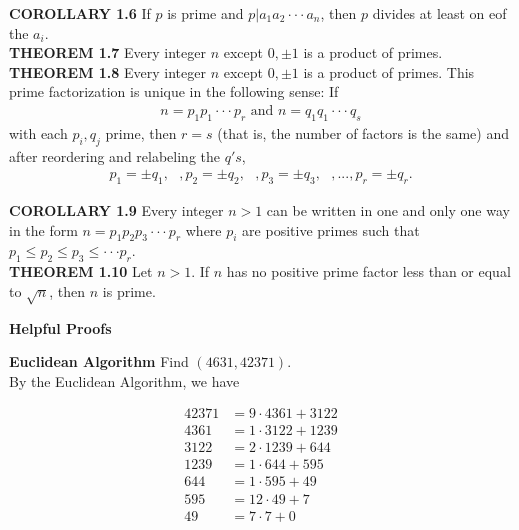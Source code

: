 \documentclass[12pt]{article}
\begin{document}
\noindent
\textbf{COROLLARY 1.6} If $p$ is prime and $p|a_1a_2 \cdot \cdot \cdot a_n$, then $p$ divides at least on eof the $a_i$. \\

\noindent
\textbf{THEOREM 1.7} Every integer $n$ except $0, \pm 1$ is a product of primes. \\

\noindent
\textbf{THEOREM 1.8} Every integer $n$ except $0, \pm 1$ is a product of primes. This prime factorization is unique in the following sense: If
\begin{align*}
n=p_1p_1 \cdot \cdot \cdot p_r \text{     and     } n=q_1q_1 \cdot \cdot \cdot q_s
\end{align*}
with each $p_i, q_j$ prime, then $r=s$ (that is, the number of factors is the same) and after reordering and relabeling the $q's$,
\begin{align*}
p_1=\pm q_1, \text{     }, p_2=\pm q_2, \text{     }, p_3=\pm q_3, \text{     }, ..., p_r=\pm q_r.
\end{align*}

\noindent
\textbf{COROLLARY 1.9} Every integer $n>1$ can be written in one and only one way in the form $n=p_1p_2p_3 \cdot \cdot \cdot p_r$ where $p_i$ are positive primes such that $p_1 \leq p_2 \leq p_3 \leq \cdot \cdot \cdot p_r$. \\

\noindent
\textbf{THEOREM 1.10} Let $n>1$. If $n$ has no positive prime factor less than or equal to $\sqrt{n}$, then $n$ is prime. \\

\begin{center}
\textbf{Helpful Proofs}
\end{center}

\noindent
\textbf{Euclidean Algorithm} Find $(4631, 42371)$. \\

\noindent
By the Euclidean Algorithm, we have 

\begin{align*}
42371 & = 9 \cdot 4361 + 3122 \\
4361 & = 1 \cdot 3122 + 1239 \\
3122 & = 2 \cdot 1239 + 644 \\
1239 & = 1 \cdot 644 + 595 \\
644 & = 1 \cdot 595 + 49 \\
595 & = 12 \cdot 49 + 7 \\
49 & = 7 \cdot 7 + 0 \\
\end{align*}
\end{document}
